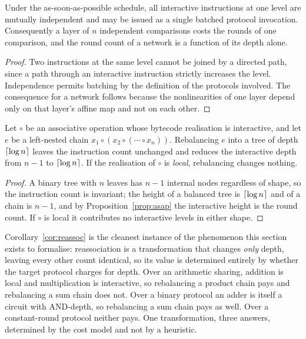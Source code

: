 \begin{corolary}
\label{cor:batching}
Under the as-soon-as-possible schedule, all interactive instructions at one level
are mutually independent and may be issued as a single batched protocol
invocation. Consequently a layer of $n$ independent comparisons costs the rounds
of one comparison, and the round count of a network is a function of its depth
alone.
\end{corolary}

\begin{proof}
Two instructions at the same level cannot be joined by a directed path, since a
path through an interactive instruction strictly increases the level. Independence
permits batching by the definition of the protocols involved. The consequence for
a network follows because the nonlinearities of one layer depend only on that
layer's affine map and not on each other.
\end{proof}

\begin{corolary}
\label{cor:reassoc}
Let $\circ$ be an associative operation whose bytecode realisation is interactive,
and let $e$ be a left-nested chain $x_1 \circ (x_2 \circ (\cdots \circ x_n))$.
Rebalancing $e$ into a tree of depth $\left\lceil \log n \right\rceil$ leaves the instruction count
unchanged and reduces the interactive depth from $n-1$ to $\left\lceil \log n \right\rceil$. If the
realisation of $\circ$ is \emph{local}, rebalancing changes nothing.
\end{corolary}

\begin{proof}
A binary tree with $n$ leaves has $n-1$ internal nodes regardless of shape, so the
instruction count is invariant; the height of a balanced tree is $\left\lceil \log n \right\rceil$
and of a chain is $n-1$, and by Proposition~\ref{prop:asap} the interactive height
is the round count. If $\circ$ is local it contributes no interactive levels in
either shape.
\end{proof}

Corollary~\ref{cor:reassoc} is the cleanest instance of the phenomenon this
section exists to formalise: reassociation is a transformation that changes
\emph{only} depth, leaving every other count identical, so its value is determined
entirely by whether the target protocol charges for depth. Over an arithmetic
sharing, addition is local and multiplication is interactive, so rebalancing a
product chain pays and rebalancing a sum chain does not. Over a binary protocol an
adder is itself a circuit with AND-depth, so rebalancing a sum chain pays as well.
Over a constant-round protocol neither pays. One transformation, three answers,
determined by the cost model and not by a heuristic.

